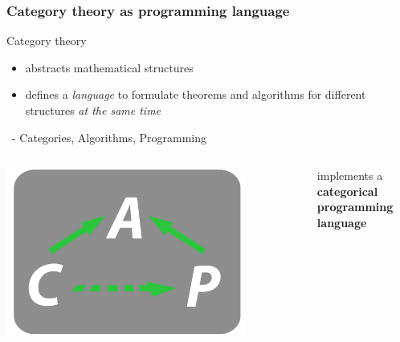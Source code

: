 \begin{frame}
\frametitle{Category theory as programming language}
 \begin{block}{Category theory} \pause
 \begin{itemize}
  \item abstracts mathematical structures \pause
  \item defines a \textit{language} to formulate theorems and algorithms for different structures \textit{at the same time}\pause
 \end{itemize} 
 \end{block}
 \begin{block}{\CapPkg\ - Categories, Algorithms, Programming}
  \begin{columns}[onlytextwidth, t]
   \vspace{0.1em}
 \includegraphics[width=\textwidth,height=0.8\textwidth]{Logo_CAPtrans.png} \pause
   \begin{center}
   \hspace{2em}\CapPkg implements a \newline \textbf{categorical programming language}
   \end{center}
  \end{columns}
 \end{block}
\end{frame}

